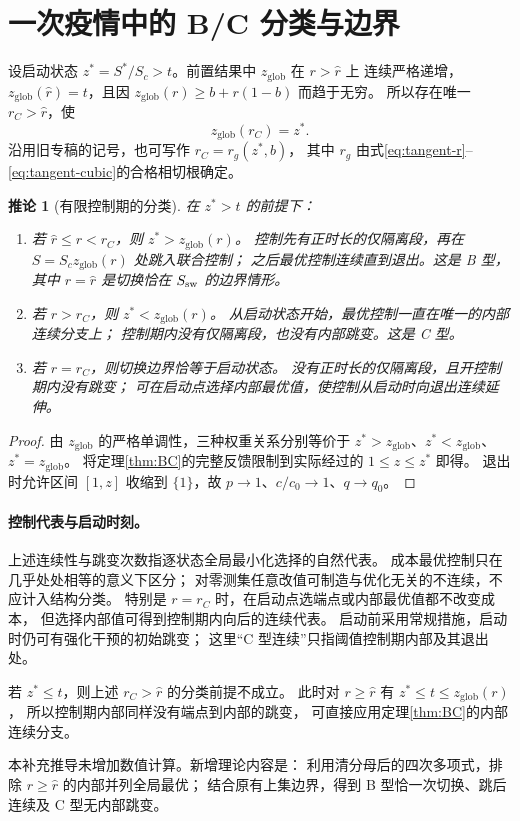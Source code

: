 \documentclass[UTF8,zihao=-4]{ctexart}
\newtheorem{corollary}[theorem]{推论}
\theoremstyle{definition}
\newcommand{\rhat}{\hat r}
\newcommand{\zglob}{z_{\mathrm{glob}}}
\begin{document}
\section{一次疫情中的 B/C 分类与边界}

设启动状态 $z^*=S^*/S_c>t$。前置结果中 $\zglob$ 在 $r>\rhat$ 上
连续严格递增，$\zglob(\rhat)=t$，且因 $\zglob(r)\ge b+r(1-b)$ 而趋于无穷。
所以存在唯一 $r_C>\rhat$，使
\begin{equation}\label{eq:rC}
 \zglob(r_C)=z^*.
\end{equation}
沿用旧专稿的记号，也可写作 $r_C=r_g(z^*,b)$，
其中 $r_g$ 由式\eqref{eq:tangent-r}--\eqref{eq:tangent-cubic}的合格相切根确定。

\begin{corollary}[有限控制期的分类]
在 $z^*>t$ 的前提下：
\begin{enumerate}
\item 若 $\rhat\le r<r_C$，则 $z^*>\zglob(r)$。
控制先有正时长的仅隔离段，再在 $S=S_c\zglob(r)$ 处跳入联合控制；
之后最优控制连续直到退出。这是 B 型，其中 $r=\rhat$ 是切换恰在 $S_{\rm sw}$ 的边界情形。
\item 若 $r>r_C$，则 $z^*<\zglob(r)$。
从启动状态开始，最优控制一直在唯一的内部连续分支上；
控制期内没有仅隔离段，也没有内部跳变。这是 C 型。
\item 若 $r=r_C$，则切换边界恰等于启动状态。
没有正时长的仅隔离段，且开控制期内没有跳变；
可在启动点选择内部最优值，使控制从启动时向退出连续延伸。
\end{enumerate}
\end{corollary}
\begin{proof}
由 $\zglob$ 的严格单调性，三种权重关系分别等价于
$z^*>\zglob$、$z^*<\zglob$、$z^*=\zglob$。
将定理\ref{thm:BC}的完整反馈限制到实际经过的 $1\le z\le z^*$ 即得。
退出时允许区间 $[1,z]$ 收缩到 $\{1\}$，故 $p\to1$、$c/c_0\to1$、$q\to q_0$。
\end{proof}

\paragraph{控制代表与启动时刻。}
上述连续性与跳变次数指逐状态全局最小化选择的自然代表。
成本最优控制只在几乎处处相等的意义下区分；
对零测集任意改值可制造与优化无关的不连续，不应计入结构分类。
特别是 $r=r_C$ 时，在启动点选端点或内部最优值都不改变成本，
但选择内部值可得到控制期内向后的连续代表。
启动前采用常规措施，启动时仍可有强化干预的初始跳变；
这里“C 型连续”只指阈值控制期内部及其退出处。

若 $z^*\le t$，则上述 $r_C>\rhat$ 的分类前提不成立。
此时对 $r\ge\rhat$ 有 $z^*\le t\le\zglob(r)$，
所以控制期内部同样没有端点到内部的跳变，
可直接应用定理\ref{thm:BC}的内部连续分支。

本补充推导未增加数值计算。新增理论内容是：
利用清分母后的四次多项式，排除 $r\ge\rhat$ 的内部并列全局最优；
结合原有上集边界，得到 B 型恰一次切换、跳后连续及 C 型无内部跳变。
\end{document}
